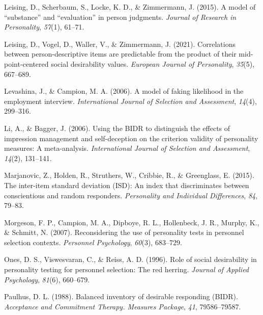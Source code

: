 \documentclass[
  ,jou]{apa6}
\newlength{\cslhangindent}
\newlength{\cslentryspacingunit} %
\newenvironment{CSLReferences}[2] %
 {%
  \setlength{\parindent}{0pt}
  \ifodd #1
  \let\oldpar\par
  \def\par{\hangindent=\cslhangindent\oldpar}
  \fi
  \setlength{\parskip}{#2\cslentryspacingunit}
 }%
 {}
\begin{document}
\begin{CSLReferences}{1}{0}
\leavevmode{}%
Leising, D., Scherbaum, S., Locke, K. D., \& Zimmermann, J. (2015). A model of {``substance''} and {``evaluation''} in person judgments. \emph{Journal of Research in Personality}, \emph{57}(1), 61--71.

\leavevmode{}%
Leising, D., Vogel, D., Waller, V., \& Zimmermann, J. (2021). Correlations between person-descriptive items are predictable from the product of their mid-point-centered social desirability values. \emph{European Journal of Personality}, \emph{35}(5), 667--689.

\leavevmode{}%
Levashina, J., \& Campion, M. A. (2006). A model of faking likelihood in the employment interview. \emph{International Journal of Selection and Assessment}, \emph{14}(4), 299--316.

\leavevmode{}%
Li, A., \& Bagger, J. (2006). Using the {BIDR} to distinguish the effects of impression management and self-deception on the criterion validity of personality measures: A meta-analysis. \emph{International Journal of Selection and Assessment}, \emph{14}(2), 131--141.

\leavevmode{}%
Marjanovic, Z., Holden, R., Struthers, W., Cribbie, R., \& Greenglass, E. (2015). The inter-item standard deviation ({ISD}): An index that discriminates between conscientious and random responders. \emph{Personality and Individual Differences}, \emph{84}, 79--83.

\leavevmode{}%
Morgeson, F. P., Campion, M. A., Dipboye, R. L., Hollenbeck, J. R., Murphy, K., \& Schmitt, N. (2007). Reconsidering the use of personality tests in personnel selection contexts. \emph{Personnel Psychology}, \emph{60}(3), 683--729.

\leavevmode{}%
Ones, D. S., Viswesvaran, C., \& Reiss, A. D. (1996). Role of social desirability in personality testing for personnel selection: The red herring. \emph{Journal of Applied Psychology}, \emph{81}(6), 660--679.

\leavevmode{}%
Paulhus, D. L. (1988). Balanced inventory of desirable responding ({BIDR}). \emph{Acceptance and Commitment Therapy. Measures Package}, \emph{41}, 79586--79587.


\end{CSLReferences}
\end{document}
